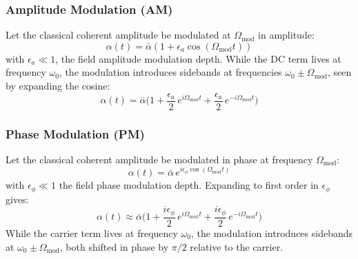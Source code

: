 \subsubsection*{Amplitude Modulation (AM)}

Let the classical coherent amplitude be modulated at $\Omega_{\text{mod}}$ in amplitude:
\begin{equation}
  \alpha(t) = \bar{\alpha} \left(1 + \epsilon_a \cos(\Omega_{\text{mod}} t)\right)
\end{equation}
with $\epsilon_a \ll 1$, the field amplitude modulation depth. While the DC term lives at frequency $\omega_0$, the modulation introduces sidebands at frequencies $\omega_0 \pm \Omega_{\text{mod}}$, seen by expanding the cosine:
\begin{equation}
  \alpha(t) = \bar{\alpha} \Big( 1 + \frac{\epsilon_a }{2}\, e^{i\Omega_{\text{mod}} t} + \frac{\epsilon_a }{2} \,  e^{-i\Omega_{\text{mod}} t} \Big)
\end{equation}


\subsubsection*{Phase Modulation (PM)}
Let the classical coherent amplitude be modulated in phase at frequency $\Omega_{\mathrm{mod}}$:
\begin{equation}
\alpha(t) = \bar{\alpha} \, e^{i \epsilon_{\phi} \cos(\Omega_{\mathrm{mod}} t)}
\label{eq:PM_def}
\end{equation}
with $\epsilon_{\phi} \ll 1$ the field phase modulation depth. Expanding to first order in $\epsilon_{\phi}$ gives:
\begin{equation}
\alpha(t) \approx \bar{\alpha} \Big( 1 + \frac{i \epsilon_{\phi} }{2} \, e^{i\Omega_{\mathrm{mod}} t} + \frac{i \epsilon_{\phi} }{2} \, e^{-i\Omega_{\mathrm{mod}} t} \Big)
\label{eq:PM_expand}
\end{equation}
While the carrier term lives at frequency $\omega_0$, the modulation introduces sidebands at $\omega_0 \pm \Omega_{\mathrm{mod}}$, both shifted in phase by $\pi/2$ relative to the carrier.

